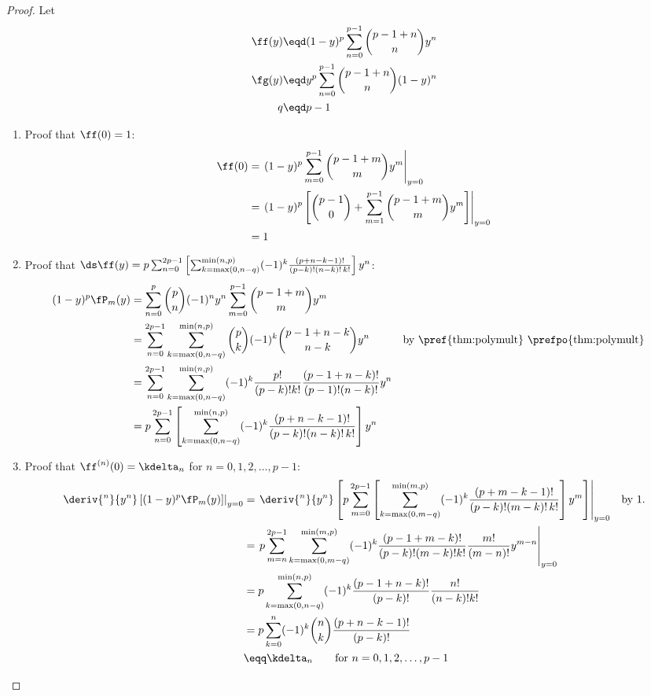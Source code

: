 \begin{proof}
Let
\begin{align*}
  \ff(y) &\eqd (1-y)^p \sum_{n=0}^{p-1} {p-1+n \choose n} y^n      \\
  \fg(y) &\eqd y^p     \sum_{n=0}^{p-1} {p-1+n \choose n} (1-y)^n  \\
  q      &\eqd p-1
\end{align*}
  \begin{enumerate}
  \item Proof that $\ff(0)=1$:
  \begin{align*}
  \ff(0)
    &= \left.(1-y)^p \sum_{m=0}^{p-1} {p-1+m\choose m} y^m \right|_{y=0}
  \\&= \left.(1-y)^p \left[{p-1 \choose 0} + \sum_{m=1}^{p-1} {p-1+m\choose m} y^m\right]\right|_{y=0}
  \\&= 1
  \end{align*}

  \item Proof that
      $\ds\ff(y)=
       p \sum_{n=0}^{2p-1}
       \left[\sum_{k=\max(0,n-q)}^{\min(n,p)} (-1)^k \frac{(p+n-k-1)!}{(p-k)!(n-k)!\,k!}\right]
       y^n$:
  \begin{align*}
  (1-y)^p \fP_m(y)
    &= \sum_{n=0}^p     {p\choose n} (-1)^n y^n
       \sum_{m=0}^{p-1} {p-1+m\choose m} y^m
  \\&= \sum_{n=0}^{2p-1} \sum_{k=\max(0,n-q)}^{\min(n,p)}
       {p\choose k} (-1)^k {p-1+n-k\choose n-k} y^n
    && \text{by \pref{thm:polymult} \prefpo{thm:polymult}}
  \\&= \sum_{n=0}^{2p-1} \sum_{k=\max(0,n-q)}^{\min(n,p)}
       (-1)^k \frac{p!}{(p-k)!k!} \frac{(p-1+n-k)!}{(p-1)!(n-k)!} y^n
  \\&= p \sum_{n=0}^{2p-1}
       \left[\sum_{k=\max(0,n-q)}^{\min(n,p)} (-1)^k \frac{(p+n-k-1)!}{(p-k)!(n-k)!\,k!}\right]
       y^n
  \end{align*}

  \item Proof that $\ff^{(n)}(0)=\kdelta_n$ for $n=0,1,2,\ldots,p-1$:
  \begin{align*}
  \left.\deriv{^n}{y^n}\left[ (1-y)^p \fP_m(y) \right]\right|_{y=0}
    &= \left.
       \deriv{^n}{y^n}\left[
         p \sum_{m=0}^{2p-1}
         \left[\sum_{k=\max(0,m-q)}^{\min(m,p)} (-1)^k \frac{(p+m-k-1)!}{(p-k)!(m-k)!\,k!}\right]
         y^m
       \right]
       \right|_{y=0}
    && \text{by 1.}
  \\&= \left. p
       \sum_{m=n}^{2p-1} \sum_{k=\max(0,m-q)}^{\min(m,p)}
       (-1)^k \frac{(p-1+m-k)!}{(p-k)!(m-k)!k!} \frac{m!}{(m-n)!}y^{m-n}
       \right|_{y=0}
  \\&= p \sum_{k=\max(0,n-q)}^{\min(n,p)}
       (-1)^k \frac{(p-1+n-k)!}{(p-k)!} \frac{n!}{(n-k)!k!}
  \\&= p \sum_{k=0}^n
       (-1)^k {n\choose k} \frac{(p+n-k-1)!}{(p-k)!}
  \\&\eqq \kdelta_n \qquad\text{for } n=0,1,2,\ldots,p-1
  \end{align*}


\end{enumerate}
\end{proof}
